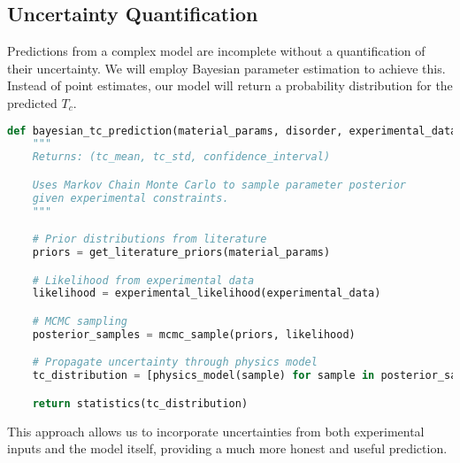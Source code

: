 \subsection{Uncertainty Quantification}
Predictions from a complex model are incomplete without a quantification of their uncertainty. We will employ Bayesian parameter estimation to achieve this. Instead of point estimates, our model will return a probability distribution for the predicted $T_c$.
\begin{lstlisting}[language=Python, caption={Bayesian Tc Prediction Workflow}]
def bayesian_tc_prediction(material_params, disorder, experimental_data):
    """
    Returns: (tc_mean, tc_std, confidence_interval)

    Uses Markov Chain Monte Carlo to sample parameter posterior
    given experimental constraints.
    """

    # Prior distributions from literature
    priors = get_literature_priors(material_params)

    # Likelihood from experimental data
    likelihood = experimental_likelihood(experimental_data)

    # MCMC sampling
    posterior_samples = mcmc_sample(priors, likelihood)

    # Propagate uncertainty through physics model
    tc_distribution = [physics_model(sample) for sample in posterior_samples]

    return statistics(tc_distribution)
\end{lstlisting}
This approach allows us to incorporate uncertainties from both experimental inputs and the model itself, providing a much more honest and useful prediction.
